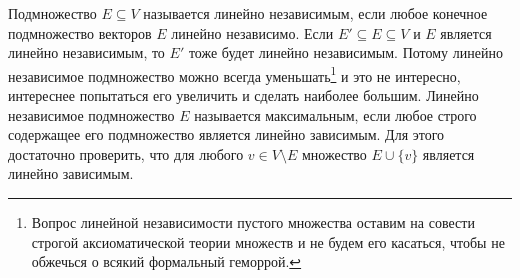 Подмножество $E\subseteq V$ называется линейно независимым, если любое конечное подмножество векторов $E$ линейно независимо. Если $E'\subseteq E\subseteq V$ и $E$ является линейно независимым, то $E'$ тоже будет линейно независимым. Потому линейно независимое подмножество можно всегда уменьшать\footnote{Вопрос линейной независимости пустого множества оставим на совести строгой аксиоматической теории множеств и не будем его касаться, чтобы не обжечься о всякий формальный геморрой.} и это не интересно, интереснее попытаться его увеличить и сделать наиболее большим. Линейно независимое подмножество $E$ называется максимальным, если любое строго содержащее его подмножество является линейно зависимым. Для этого достаточно проверить, что для любого $v\in V\setminus E$ множество $E\cup \{v\}$ является линейно зависимым.

